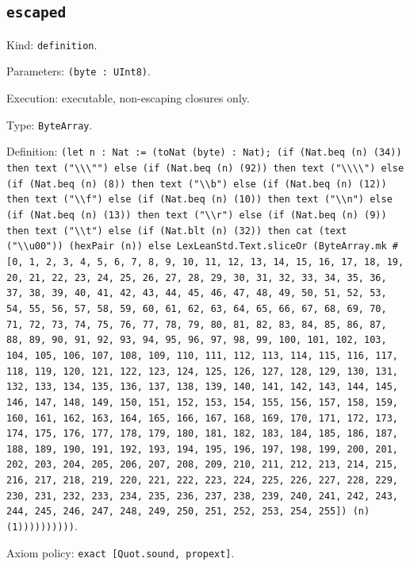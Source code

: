 \documentclass[11pt]{article}
\begin{document}
\subsection*{\texttt{escaped}}
\noindent Kind: \texttt{definition}.\par
\noindent Parameters: \texttt{(byte : UInt8)}.\par
\noindent Execution: executable, non-escaping closures only.\par
\noindent Type: \texttt{ByteArray}.\par
\noindent Definition: \texttt{(let n : Nat := (toNat (byte) : Nat); (if (Nat.beq (n) (34)) then text ("\textbackslash{}\textbackslash{}\textbackslash{}"") else (if (Nat.beq (n) (92)) then text ("\textbackslash{}\textbackslash{}\textbackslash{}\textbackslash{}") else (if (Nat.beq (n) (8)) then text ("\textbackslash{}\textbackslash{}b") else (if (Nat.beq (n) (12)) then text ("\textbackslash{}\textbackslash{}f") else (if (Nat.beq (n) (10)) then text ("\textbackslash{}\textbackslash{}n") else (if (Nat.beq (n) (13)) then text ("\textbackslash{}\textbackslash{}r") else (if (Nat.beq (n) (9)) then text ("\textbackslash{}\textbackslash{}t") else (if (Nat.blt (n) (32)) then cat (text ("\textbackslash{}\textbackslash{}u00")) (hexPair (n)) else LexLeanStd.Text.sliceOr (ByteArray.mk \#[0, 1, 2, 3, 4, 5, 6, 7, 8, 9, 10, 11, 12, 13, 14, 15, 16, 17, 18, 19, 20, 21, 22, 23, 24, 25, 26, 27, 28, 29, 30, 31, 32, 33, 34, 35, 36, 37, 38, 39, 40, 41, 42, 43, 44, 45, 46, 47, 48, 49, 50, 51, 52, 53, 54, 55, 56, 57, 58, 59, 60, 61, 62, 63, 64, 65, 66, 67, 68, 69, 70, 71, 72, 73, 74, 75, 76, 77, 78, 79, 80, 81, 82, 83, 84, 85, 86, 87, 88, 89, 90, 91, 92, 93, 94, 95, 96, 97, 98, 99, 100, 101, 102, 103, 104, 105, 106, 107, 108, 109, 110, 111, 112, 113, 114, 115, 116, 117, 118, 119, 120, 121, 122, 123, 124, 125, 126, 127, 128, 129, 130, 131, 132, 133, 134, 135, 136, 137, 138, 139, 140, 141, 142, 143, 144, 145, 146, 147, 148, 149, 150, 151, 152, 153, 154, 155, 156, 157, 158, 159, 160, 161, 162, 163, 164, 165, 166, 167, 168, 169, 170, 171, 172, 173, 174, 175, 176, 177, 178, 179, 180, 181, 182, 183, 184, 185, 186, 187, 188, 189, 190, 191, 192, 193, 194, 195, 196, 197, 198, 199, 200, 201, 202, 203, 204, 205, 206, 207, 208, 209, 210, 211, 212, 213, 214, 215, 216, 217, 218, 219, 220, 221, 222, 223, 224, 225, 226, 227, 228, 229, 230, 231, 232, 233, 234, 235, 236, 237, 238, 239, 240, 241, 242, 243, 244, 245, 246, 247, 248, 249, 250, 251, 252, 253, 254, 255]) (n) (1))))))))))}.\par
\noindent Axiom policy: \texttt{exact [Quot.sound, propext]}.\par
\end{document}
